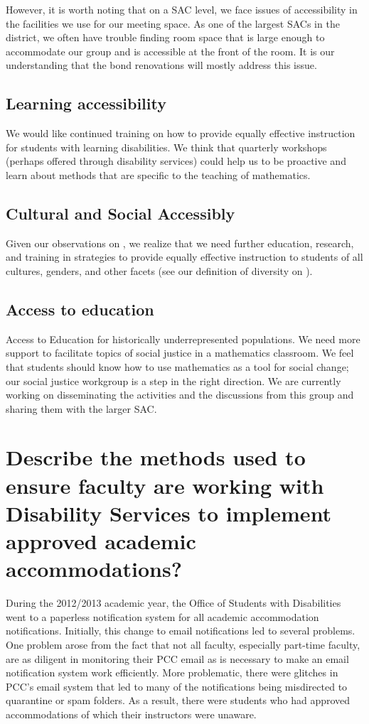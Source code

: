However, it is worth noting that on a SAC level, we face issues of accessibility in the facilities we use for our meeting space. As one of the largest SACs in the district, we often have trouble finding room space that is large enough to accommodate our group and is accessible at the front of the room. It is our understanding that the bond renovations will mostly address this issue.

\subsection{Learning accessibility}
We would like continued training on how to provide equally effective instruction for students with learning disabilities. We think that quarterly workshops (perhaps offered through disability services) could help us to be proactive and learn about methods that are specific to the teaching of mathematics.

\subsection{Cultural and Social Accessibly}
Given our observations on , we realize that we need further education, research, and training in strategies to provide equally effective instruction to students of all cultures, genders, and other facets (see our definition of diversity on ).

\subsection{Access to education}
Access to Education for historically underrepresented populations. We need more support to facilitate topics of social justice in a mathematics classroom. We feel that students should know how to use mathematics as a tool for social change; our social justice workgroup is a step in the right direction. We are currently working on disseminating the activities and the discussions from this group and sharing them with the larger SAC.

\section{Describe the methods used to ensure faculty are working with Disability Services to implement approved academic accommodations?}
During the 2012/2013 academic year, the Office of Students with Disabilities went to a paperless notification system for all academic accommodation notifications.  Initially, this change to email notifications led to several problems.  One problem arose from the fact that not all faculty, especially part-time faculty, are as diligent in monitoring their PCC email as is necessary to make an email notification system work efficiently.  More problematic, there were glitches in PCC's email system that led to many of the notifications being misdirected to quarantine or spam folders.  As a result, there were students who had approved accommodations of which their instructors were unaware.

